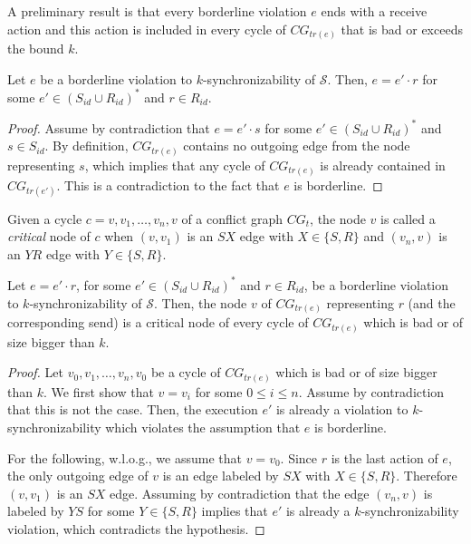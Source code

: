 A preliminary result is that every borderline violation $e$ ends with a receive action and this action is included in every cycle of $CG_{tr(e)}$ that is 
bad or exceeds the bound $k$. 

\begin{lemma}
Let $e$ be a borderline violation to $k$-synchronizability of $\mathcal{S}$. Then, $e = e'\cdot r$ for some $e'\in (S_{id}\cup R_{id})^*$ and $r\in R_{id}$.
\end{lemma}
\begin{proof}
Assume by contradiction that $e=e'\cdot s$ for some $e'\in (S_{id}\cup R_{id})^*$ and $s\in S_{id}$. By definition, $CG_{tr(e)}$ contains no outgoing
edge from the node representing $s$, which implies that any cycle of $CG_{tr(e)}$ is already contained in $CG_{tr(e')}$. This is a contradiction to 
the fact that $e$ is borderline.
\end{proof}

Given a cycle $c = v,v_1,\ldots,v_n,v$ of a conflict graph $CG_t$, the node $v$ is called a \emph{critical} node of $c$ when $(v,v_1)$ is an $SX$ edge with $X\in \{S,R\}$ 
and $(v_n,v)$ is an $YR$ edge with $Y\in \{S,R\}$.

\begin{lemma}
Let $e = e'\cdot r$, for some $e'\in (S_{id}\cup R_{id})^*$ and $r\in R_{id}$, be a borderline violation to $k$-synchronizability of $\mathcal{S}$. 
Then, the node $v$ of $CG_{tr(e)}$ representing $r$ (and the corresponding send) is a critical node of every cycle of 
$CG_{tr(e)}$ which is bad or of size bigger than $k$. %
\end{lemma}
\begin{proof}
Let $v_0,v_1,\ldots,v_n,v_0$ be a cycle of $CG_{tr(e)}$ which is bad or of size bigger than $k$. We first show that $v=v_i$ for some $0\leq i\leq n$. 
Assume by contradiction that this is not the case. Then, the execution $e'$ is already a violation to $k$-synchronizability which violates the assumption that $e$ is borderline.

For the following, w.l.o.g., we assume that $v=v_0$. Since $r$ is the last action of $e$, the only outgoing edge of $v$ is an edge labeled by $SX$ with $X\in \{S,R\}$. Therefore $(v,v_1)$ is an $SX$ edge. 
Assuming by contradiction that the edge $(v_n,v)$ is labeled by $YS$ for some $Y\in \{S,R\}$ implies that $e'$ is already a $k$-synchronizability violation, which contradicts the hypothesis.
\end{proof}



